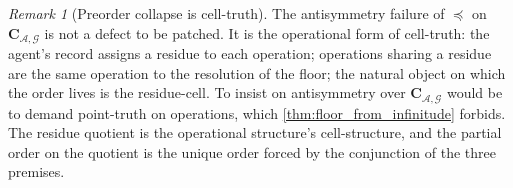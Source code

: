 \documentclass[11pt,twocolumn,a4paper]{article}
\theoremstyle{thmstyle}
\theoremstyle{definition}
\theoremstyle{remark}
\newtheorem{remark}[theorem]{Remark}
\newcommand{\Graph}{\mathcal{G}}
\newcommand{\Agent}{\mathcal{A}}
\begin{document}
\begin{remark}[Preorder collapse is cell-truth]
\label{rem:preorder_cell_truth}
The antisymmetry failure of $\preceq$ on $\mathbf{C}_{\Agent,
\Graph}$ is not a defect to be patched. It is the operational form
of cell-truth: the agent's record assigns a residue to each
operation; operations sharing a residue are the same operation to
the resolution of the floor; the natural object on which the order
lives is the residue-cell. To insist on antisymmetry over
$\mathbf{C}_{\Agent,\Graph}$ would be to demand point-truth on
operations, which \cref{thm:floor_from_infinitude} forbids. The
residue quotient is the operational structure's cell-structure, and
the partial order on the quotient is the unique order forced by
the conjunction of the three premises.
\end{remark}
\end{document}
